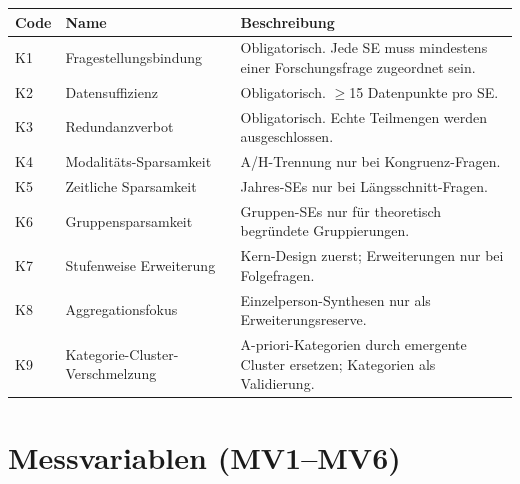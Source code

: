 \documentclass[11pt,a4paper]{article}
\theoremstyle{definition}
\theoremstyle{plain}
\theoremstyle{remark}
\begin{document}
\begin{longtable}{l p{3cm} p{8cm}}
  \toprule
  \textbf{Code} & \textbf{Name} & \textbf{Beschreibung} \\
  \midrule
  \endhead
  K1 & Fragestellungsbindung & Obligatorisch. Jede SE muss mindestens einer Forschungsfrage zugeordnet sein. \\
  K2 & Datensuffizienz & Obligatorisch. $\geq$15 Datenpunkte pro SE. \\
  K3 & Redundanzverbot & Obligatorisch. Echte Teilmengen werden ausgeschlossen. \\
  K4 & Modalit\"ats-Sparsamkeit & A/H-Trennung nur bei Kongruenz-Fragen. \\
  K5 & Zeitliche Sparsamkeit & Jahres-SEs nur bei L\"angsschnitt-Fragen. \\
  K6 & Gruppensparsamkeit & Gruppen-SEs nur f\"ur theoretisch begr\"undete Gruppierungen. \\
  K7 & Stufenweise Erweiterung & Kern-Design zuerst; Erweiterungen nur bei Folgefragen. \\
  K8 & Aggregationsfokus & Einzelperson-Synthesen nur als Erweiterungsreserve. \\
  K9 & Kategorie-Cluster-Verschmelzung & A-priori-Kategorien durch emergente Cluster ersetzen; Kategorien als Validierung. \\
  \bottomrule
\end{longtable}


\section{Messvariablen (MV1--MV6)}
\label{app:messvariablen}
\end{document}
